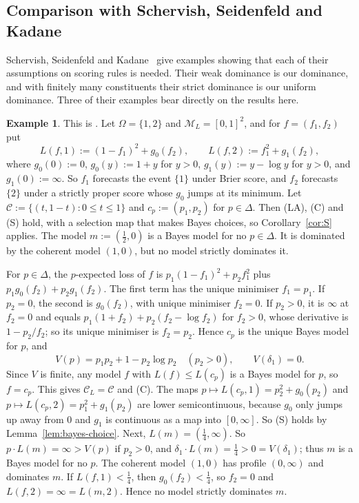 \documentclass[11pt]{article}
\theoremstyle{definition}
\newtheorem{example}[theorem]{Example}
\theoremstyle{remark}
\newcommand{\M}{\mathcal M}
\newcommand{\C}{\mathcal C}
\begin{document}
\subsection{Comparison with Schervish, Seidenfeld and Kadane}\label{sec:ssk}
Schervish, Seidenfeld and Kadane~\cite{SSK09} give examples showing that each of their assumptions on scoring rules is needed. Their weak dominance is our dominance, and with finitely many constituents their strict dominance is our uniform dominance. Three of their examples bear directly on the results here.
\begin{example}\label{ex:ssk-sharp}
This is \cite[Example~2]{SSK09}. Let $\Omega=\{1,2\}$ and $\M_L=[0,1]^2$, and for $f=(f_1,f_2)$ put
\[
 L(f,1):=(1-f_1)^2+g_0(f_2),\qquad L(f,2):=f_1^2+g_1(f_2),
\]
where $g_0(0):=0$, $g_0(y):=1+y$ for $y>0$, $g_1(y):=y-\log y$ for $y>0$, and $g_1(0):=\infty$. So $f_1$ forecasts the event $\{1\}$ under Brier score, and $f_2$ forecasts $\{2\}$ under a strictly proper score whose $g_0$ jumps at its minimum. Let $\C:=\{(t,1-t):0\le t\le1\}$ and $c_p:=(p_1,p_2)$ for $p\in\Delta$. Then (LA), (C) and (S) hold, with a selection map that makes Bayes choices, so Corollary~\ref{cor:S} applies. The model $m:=(\tfrac12,0)$ is a Bayes model for no $p\in\Delta$. It is dominated by the coherent model $(1,0)$, but no model strictly dominates it.
\end{example}
For $p\in\Delta$, the $p$-expected loss of $f$ is $p_1(1-f_1)^2+p_2f_1^2$ plus $p_1g_0(f_2)+p_2g_1(f_2)$. The first term has the unique minimiser $f_1=p_1$. If $p_2=0$, the second is $g_0(f_2)$, with unique minimiser $f_2=0$. If $p_2>0$, it is $\infty$ at $f_2=0$ and equals $p_1(1+f_2)+p_2(f_2-\log f_2)$ for $f_2>0$, whose derivative is $1-p_2/f_2$; so its unique minimiser is $f_2=p_2$. Hence $c_p$ is the unique Bayes model for $p$, and
\[
 V(p)=p_1p_2+1-p_2\log p_2\quad(p_2>0),\qquad V(\delta_1)=0.
\]
Since $V$ is finite, any model $f$ with $L(f)\le L(c_p)$ is a Bayes model for $p$, so $f=c_p$. This gives $\C_L=\C$ and (C). The maps $p\mapsto L(c_p,1)=p_2^2+g_0(p_2)$ and $p\mapsto L(c_p,2)=p_1^2+g_1(p_2)$ are lower semicontinuous, because $g_0$ only jumps up away from $0$ and $g_1$ is continuous as a map into $[0,\infty]$. So (S) holds by Lemma~\ref{lem:bayes-choice}. Next, $L(m)=(\tfrac14,\infty)$. So $p\cdot L(m)=\infty>V(p)$ if $p_2>0$, and $\delta_1\cdot L(m)=\tfrac14>0=V(\delta_1)$; thus $m$ is a Bayes model for no $p$. The coherent model $(1,0)$ has profile $(0,\infty)$ and dominates $m$. If $L(f,1)<\tfrac14$, then $g_0(f_2)<\tfrac14$, so $f_2=0$ and $L(f,2)=\infty=L(m,2)$. Hence no model strictly dominates $m$.
\end{document}
